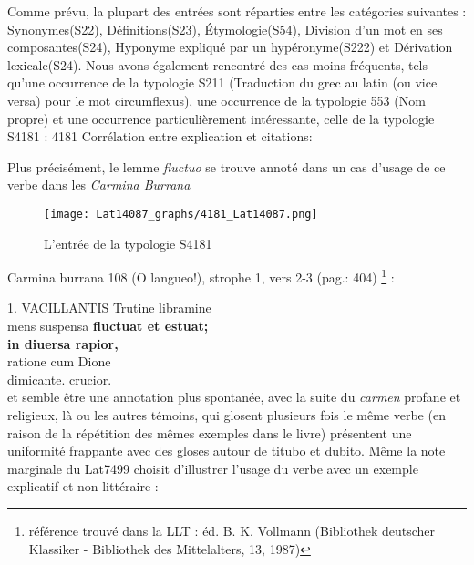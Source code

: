 \documentclass[a4paper, twoside, 12pt]{book}
\begin{document}
{Comme prévu, la plupart des entrées sont réparties entre les catégories suivantes : Synonymes(S22), Définitions(S23), Étymologie(S54), Division d'un mot en ses composantes(S24), Hyponyme expliqué par un hypéronyme(S222) et Dérivation lexicale(S24). Nous avons également rencontré des cas moins fréquents, tels qu'une occurrence de la typologie S211 (Traduction du grec au latin (ou vice versa) pour le mot \og{}circumflexus\fg{}), une occurrence de la typologie 553 (Nom propre) et une occurrence particulièrement intéressante, celle de la typologie S4181 : \og{}4181 Corrélation entre explication et citations\fg{}:

Plus précisément, le lemme \textit{fluctuo} se trouve annoté dans un cas d'usage de ce verbe dans les \textit{Carmina Burrana} \\

\begin{figure}[H]
  \centering
  \texttt{[image: Lat14087\_graphs/4181\_Lat14087.png]}
  \caption{L'entrée de la typologie S4181}
  \label{fig:4181Lat14087}
\end{figure}

Carmina burrana 108 (O langueo!), strophe 1, vers 2-3 (pag.: 404) \footnote{référence trouvé dans la LLT : éd. B. K. Vollmann (Bibliothek deutscher Klassiker - Bibliothek des Mittelalters, 13, 1987)} : 

1. VACILLANTIS Trutine libramine \\
mens suspensa \textbf{fluctuat et estuat;} \\
\textbf{in diuersa rapior,} \\
ratione cum Dione \\
dimicante. crucior. \\


et semble être une annotation plus spontanée, avec la suite du \textit{carmen} profane et religieux,  là ou les autres témoins, qui glosent plusieurs fois le même verbe (en raison de la répétition des mêmes exemples dans le livre) présentent une uniformité frappante avec des gloses autour de \og{}titubo\fg{} et \og{}dubito\fg{}. Même la note marginale du Lat7499 choisit d'illustrer l'usage du verbe avec un exemple explicatif et non littéraire :

}
\end{document}
